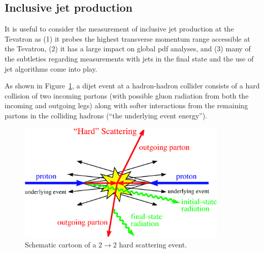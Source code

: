 \documentclass[12pt]{iopart}
\begin{document}
\subsection{Inclusive jet production}
\label{sec:jet}

It is useful to consider the measurement of inclusive jet production at the Tevatron as (1) it probes the highest transverse momentum
range accessible at the Tevatron, (2) it has a  large impact on global pdf analyses, and (3) many of the subtleties regarding
measurements  with jets in the final state and the use of jet algorithms come into play.

As shown in Figure~\ref{fig:cartoon}, a dijet event at a hadron-hadron collider consists of a hard collision of two incoming partons
(with possible gluon radiation from both  the incoming and outgoing legs) along with softer interactions from the remaining partons in
the colliding hadrons (``the underlying event energy''). 
%
\begin{figure}[t]
\begin{center}
\includegraphics[width=10cm]{hardscattering1-hepph.eps}
\end{center}
\caption{
Schematic cartoon of a $2\rightarrow 2$ hard scattering event.
\label{fig:cartoon}}
\end{figure}
%
\end{document}
